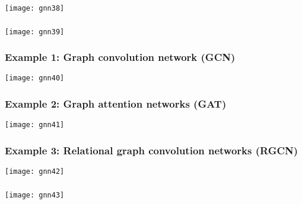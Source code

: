 \begin{frame}[fragile]\frametitle{}

\begin{center}
\texttt{[image: gnn38]}
\end{center}	  

\end{frame}

\begin{frame}[fragile]\frametitle{}

\begin{center}
\texttt{[image: gnn39]}
\end{center}	  

\end{frame}

\begin{frame}[fragile]\frametitle{Example 1: Graph convolution network (GCN)}

\begin{center}
\texttt{[image: gnn40]}
\end{center}	  

\end{frame}


\begin{frame}[fragile]\frametitle{Example 2: Graph attention networks (GAT)}

\begin{center}
\texttt{[image: gnn41]}
\end{center}	  

\end{frame}

\begin{frame}[fragile]\frametitle{Example 3: Relational graph convolution networks (RGCN)}

\begin{center}
\texttt{[image: gnn42]}
\end{center}	  

\end{frame}

\begin{frame}[fragile]\frametitle{}

\begin{center}
\texttt{[image: gnn43]}
\end{center}	  

\end{frame}

